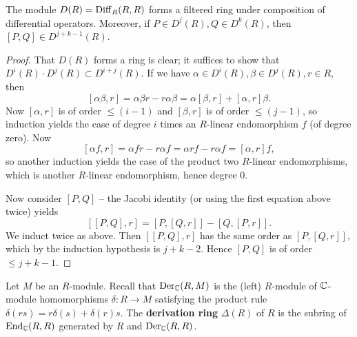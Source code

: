 \begin{lemma}
    The module $D(R)=\operatorname{Diff}_R(R,R)$ forms a filtered ring under composition of
    differential operators. Moreover, if $P\in D^j(R), Q\in D^k(R)$, then $[P,Q]\in D^{j+k-1}(R)$.
    \label{lem:filtration}
\end{lemma}
\begin{proof}
    That $D(R)$ forms a ring is clear; it suffices to show that $D^i(R)\cdot D^j(R)\subset D^{i+j}(R)$.
    If we have $\alpha\in D^i(R),\beta\in D^j(R),r\in R$, then
    \[ [\alpha\beta,r] = \alpha\beta r-r\alpha\beta = \alpha[\beta,r] +[\alpha,r]\beta.  \]
    Now $[\alpha,r]$ is of order $\leqslant (i-1)$ and $[\beta,r]$ is of order $\leqslant(j-1)$, so induction
    yields the case of degree $i$ times an $R$-linear endomorphism $f$ (of degree zero). Now
    \[ [\alpha f, r]=\alpha fr-r\alpha f=\alpha rf-r\alpha f=[\alpha,r]f, \]
    so another induction yields the case of the product two $R$-linear endomorphisms, which is another
    $R$-linear endomorphism, hence degree $0$.

    Now consider $[P,Q]$ -- the Jacobi identity (or using the first equation above twice) yields
    \[ [[P,Q],r] = [P,[Q,r]] - [Q,[P,r]].\]
    We induct twice as above. Then $[ [P,Q], r]$ has the same order as $[P, [Q, r]]$,
    which by the induction hypothesis is $j+k-2$. Hence $[P,Q]$ is of order $\leqslant j+k-1$.
\end{proof}

\begin{definition}
    Let $M$ be an $R$-module. Recall that $\operatorname{Der}_{\mathbb{C}}(R,M)$ is the (left) $R$-module of $\mathbb{C}$-module homomorphisms
    $\delta:R\to M$ satisfying the product rule $\delta(rs)=r\delta(s)+\delta(r)s.$
    The \textbf{derivation ring} $\Delta(R)$ of $R$ is the subring of $\operatorname{End}_{\mathbb{C}}(R,R)$ generated
    by $R$ and $\operatorname{Der}_{\mathbb{C}}(R,R)$.
\end{definition}

